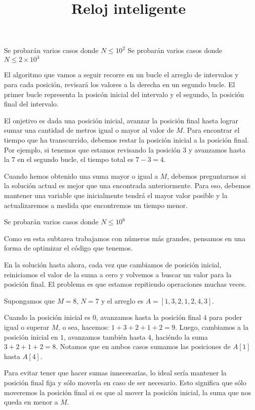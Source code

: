 \documentclass{oci}
\title{Reloj inteligente}
\begin{document}
\begin{scoreDescription}
   Se probarán varios casos donde $N\leq 10^2$
   Se probarán varios casos donde $N\leq 2\times 10^3$

  El algoritmo que vamos a seguir recorre en un bucle el arreglo de
  intervalos y para cada posici\'on, revisar\'a los valores a la derecha en 
  un segundo bucle. El primer bucle representa la posic\'on inicial del intervalo
  y el segundo, la posici\'on final del intervalo.
  
  El onjetivo es dada una posici\'on inicial, avanzar la posici\'on final hasta
  lograr sumar una cantidad de metros igual o mayor al valor de $M$.
  Para encontrar el tiempo que ha transcurrido, debemos restar la posici\'on inicial a 
  la posici\'on final. Por ejemplo, si tenemos que estamos
  revisando la posici\'on $3$ y avanzamos hasta la $7$ en el segundo bucle, el
  tiempo total es $7 - 3 = 4$.

  Cuando hemos obtenido una suma mayor o igual a $M$, debemos preguntarnos si
  la soluci\'on actual es mejor que una encontrada anteriormente. Para eso,
  debemos mantener una variable que inicialmente tendr\'a el mayor valor posible
  y la actualizaremos a medida que encontremos un tiempo menor.

   Se probarán varios casos donde $N\leq 10^6$

  Como en esta subtarea trabajamos con n\'umeros m\'as grandes, pensamos en
  una forma de optimizar el c\'odigo que tenemos.

  En la soluci\'on hasta ahora, cada vez que cambiamos de posici\'on inicial,
  reiniciamos el valor de la suma a cero y volvemos a buscar un valor para la
  posici\'on final. El problema es que estamos repitiendo operaciones muchas
  veces.

  Supongamos que $M = 8$, $N=7$ y el arreglo es $A = [1,3,2,1,2,4,3]$.

  Cuando la posici\'on inicial es $0$, avanzamos hasta la posici\'on final $4$
  para poder igual o superar $M$, o sea, hacemos: $1+3+2+1+2 = 9$. Luego,
  cambiamos a la posici\'on inicial en $1$, avanzamos tambi\'en hasta $4$, haci\'endo
  la suma $3+2+1+2 = 8$. Notamos que en ambos casos sumamos las posiciones
  de $A[1]$ hasta $A[4]$.

  Para evitar tener que hacer sumas innecesarias, lo ideal ser\'ia mantener la
  posici\'on final fija y s\'olo moverla en caso de ser necesario. Esto significa
  que s\'olo moveremos la posici\'on final si es que al mover la posici\'on
  inicial, la suma que nos queda en menor a $M$.


\end{scoreDescription}
\end{document}
